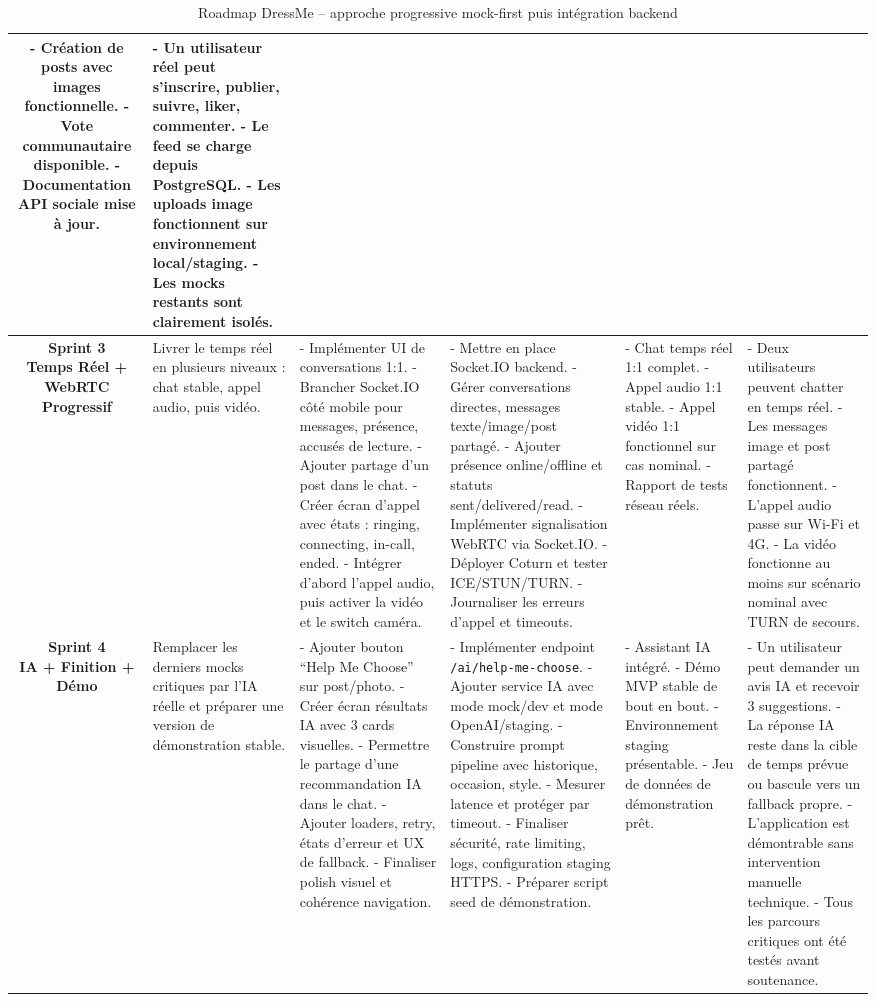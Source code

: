 \begin{table}[H]
\begin{tabularx}{\textwidth}{|c|X|X|X|X|X|}
- Création de posts avec images fonctionnelle.
- Vote communautaire disponible.
- Documentation API sociale mise à jour. &
- Un utilisateur réel peut s'inscrire, publier, suivre, liker, commenter.
- Le feed se charge depuis PostgreSQL.
- Les uploads image fonctionnent sur environnement local/staging.
- Les mocks restants sont clairement isolés. \\
\hline
\textbf{Sprint 3\\Temps Réel + WebRTC Progressif} &
Livrer le temps réel en plusieurs niveaux : chat stable, appel audio, puis vidéo. &
- Implémenter UI de conversations 1:1.
- Brancher Socket.IO côté mobile pour messages, présence, accusés de lecture.
- Ajouter partage d'un post dans le chat.
- Créer écran d'appel avec états : ringing, connecting, in-call, ended.
- Intégrer d'abord l'appel audio, puis activer la vidéo et le switch caméra. &
- Mettre en place Socket.IO backend.
- Gérer conversations directes, messages texte/image/post partagé.
- Ajouter présence online/offline et statuts sent/delivered/read.
- Implémenter signalisation WebRTC via Socket.IO.
- Déployer Coturn et tester ICE/STUN/TURN.
- Journaliser les erreurs d'appel et timeouts. &
- Chat temps réel 1:1 complet.
- Appel audio 1:1 stable.
- Appel vidéo 1:1 fonctionnel sur cas nominal.
- Rapport de tests réseau réels. &
- Deux utilisateurs peuvent chatter en temps réel.
- Les messages image et post partagé fonctionnent.
- L'appel audio passe sur Wi-Fi et 4G.
- La vidéo fonctionne au moins sur scénario nominal avec TURN de secours. \\
\hline
\textbf{Sprint 4\\IA + Finition + Démo} &
Remplacer les derniers mocks critiques par l'IA réelle et préparer une version de démonstration stable. &
- Ajouter bouton ``Help Me Choose'' sur post/photo.
- Créer écran résultats IA avec 3 cards visuelles.
- Permettre le partage d'une recommandation IA dans le chat.
- Ajouter loaders, retry, états d'erreur et UX de fallback.
- Finaliser polish visuel et cohérence navigation. &
- Implémenter endpoint \texttt{/ai/help-me-choose}.
- Ajouter service IA avec mode mock/dev et mode OpenAI/staging.
- Construire prompt pipeline avec historique, occasion, style.
- Mesurer latence et protéger par timeout.
- Finaliser sécurité, rate limiting, logs, configuration staging HTTPS.
- Préparer script seed de démonstration. &
- Assistant IA intégré.
- Démo MVP stable de bout en bout.
- Environnement staging présentable.
- Jeu de données de démonstration prêt. &
- Un utilisateur peut demander un avis IA et recevoir 3 suggestions.
- La réponse IA reste dans la cible de temps prévue ou bascule vers un fallback propre.
- L'application est démontrable sans intervention manuelle technique.
- Tous les parcours critiques ont été testés avant soutenance. \\
\hline
\end{tabularx}
\caption{Roadmap DressMe -- approche progressive mock-first puis intégration backend}
\end{table}

